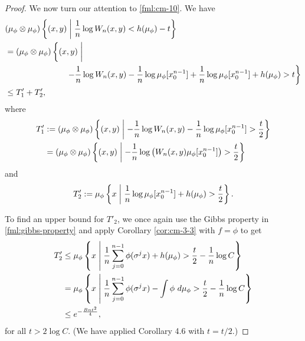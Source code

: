 \begin{theorem}
\begin{proof}
		We now turn our attention to \eqref{fml:cm-10}. We have
		\begin{align*}
			&(\mu_\phi \otimes \mu_\phi)\left\{(x, y) \midmid \frac{1}{n}\log{W_n(x, y)} < h(\mu_\phi) - t\right\} \\
				&= (\mu_\phi \otimes \mu_\phi)\left\{(x, y) \midmid \vphantom{\frac{1}{n}} \right. \\
				&\hspace{26mm} \left. -\frac{1}{n}\log{W_n(x, y)} - \frac{1}{n}\log{\mu_\phi[x_0^{n - 1}]} + \frac{1}{n}\log{\mu_\phi[x_0^{n - 1}]} + h(\mu_\phi) > t\right\} \\
				&\leq T'_1 + T'_2,
		\end{align*}
		where
		\begin{align*}
			T'_1 &:= (\mu_\phi \otimes \mu_\phi)\left\{(x, y) \mathrel{}\middle|\mathrel{} -\frac{1}{n}\log{W_n(x, y)} - \frac{1}{n}\log{\mu_\phi[x_0^{n - 1}]} > \frac{t}{2}\right\} \\
				&= (\mu_\phi \otimes \mu_\phi)\left\{(x, y) \mathrel{}\middle|\mathrel{} -\frac{1}{n}\log\left(W_n(x, y) \mu_\phi[x_0^{n - 1}]\right) > \frac{t}{2}\right\}
		\end{align*}
		and
		\[
			T'_2 := \mu_\phi \left\{x \mathrel{}\middle|\mathrel{} \frac{1}{n}\log{\mu_\phi[x_0^{n - 1}]} + h(\mu_\phi) > \frac{t}{2}\right\}.
		\]
		
		To find an upper bound for $T'_2$, we once again use the Gibbs property in \eqref{fml:gibbs-property} and apply Corollary \ref{cor:cm-3-3} with $f = \phi$ to get
		\begin{align*}
			T'_2 &\leq \mu_\phi\left\{x \mathrel{}\middle|\mathrel{} \frac{1}{n}\sum_{j = 0}^{n - 1}{\phi(\sigma^j{x})} + h(\mu_\phi) > \frac{t}{2} - \frac{1}{n}\log{C}\right\} \\
				&= \mu_\phi\left\{x \mathrel{}\middle|\mathrel{} \frac{1}{n}\sum_{j = 0}^{n - 1}{\phi(\sigma^j{x})} - \int{\phi\ d\mu_\phi} > \frac{t}{2} - \frac{1}{n}\log{C}\right\} \\
				&\leq e^{-\frac{Bnt^2}{4}},
		\end{align*}
		for all $t > 2\log{C}$. (We have applied Corollary 4.6 with $t = t / 2$.)
		

\end{proof}
\end{theorem}
